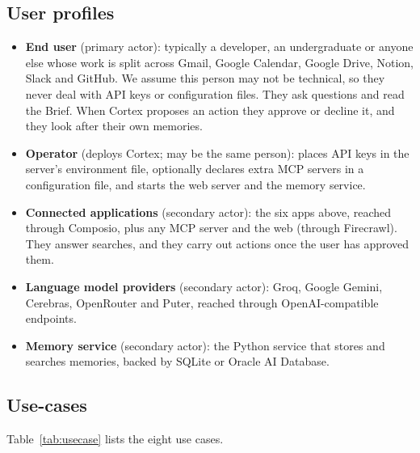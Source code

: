 \documentclass[oneside,a4paper,12pt]{report}
\begin{document}
 \subsection{User profiles}
\begin{itemize}
\item \textbf{End user} (primary actor): typically a developer, an undergraduate or anyone else whose work is split across Gmail, Google Calendar, Google Drive, Notion, Slack and GitHub. We assume this person may not be technical, so they never deal with API keys or configuration files. They ask questions and read the Brief. When Cortex proposes an action they approve or decline it, and they look after their own memories.
\item \textbf{Operator} (deploys Cortex; may be the same person): places API keys in the server's environment file, optionally declares extra MCP servers in a configuration file, and starts the web server and the memory service.
\item \textbf{Connected applications} (secondary actor): the six apps above, reached through Composio, plus any MCP server and the web (through Firecrawl). They answer searches, and they carry out actions once the user has approved them.
\item \textbf{Language model providers} (secondary actor): Groq, Google Gemini, Cerebras, OpenRouter and Puter, reached through OpenAI-compatible endpoints.
\item \textbf{Memory service} (secondary actor): the Python service that stores and searches memories, backed by SQLite or Oracle AI Database.
\end{itemize}

\subsection{Use-cases}
Table~\ref{tab:usecase} lists the eight use cases.
\end{document}
